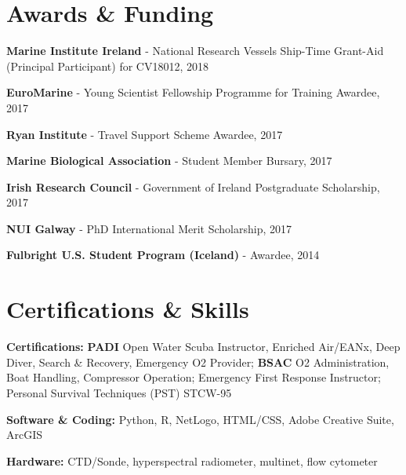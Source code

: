 \documentclass[a4paper]{deedy-resume} %
\begin{document}
\begin{flushleft}


\section{Awards \& Funding}
\sectionspace

\begin{tightitemize}
\item \textbf{Marine Institute Ireland} - National Research Vessels Ship-Time Grant-Aid (Principal Participant) for CV18012, 2018
\item \textbf{EuroMarine} - Young Scientist Fellowship Programme for Training Awardee, 2017
\item \textbf{Ryan Institute} - Travel Support Scheme Awardee, 2017
\item \textbf{Marine Biological Association} - Student Member Bursary, 2017
\item \textbf{Irish Research Council} - Government of Ireland Postgraduate Scholarship, 2017
\item \textbf{NUI Galway} - PhD International Merit Scholarship, 2017
\item \textbf{Fulbright U.S. Student Program (Iceland)} - Awardee, 2014
\end{tightitemize}

\sectionspace %



\section{Certifications \& Skills}
\sectionspace

\begin{tightitemize}
\item \textbf{Certifications:} \textbf{PADI} Open Water Scuba Instructor, Enriched Air/EANx, Deep Diver, Search \& Recovery, Emergency O2 Provider; \textbf{BSAC} O2 Administration, Boat Handling, Compressor Operation; Emergency First Response Instructor; Personal Survival Techniques (PST) STCW-95 %
\item \textbf{Software \& Coding:} Python, R, NetLogo, HTML/CSS, Adobe Creative Suite, ArcGIS
\item \textbf{Hardware:} CTD/Sonde, hyperspectral radiometer, multinet, flow cytometer
\end{tightitemize}


\end{flushleft}
\end{document}
